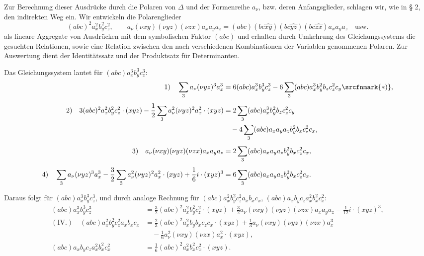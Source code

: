 Zur Berechnung dieser Ausdrücke durch die Polaren von $\Delta$ und der Formenreihe $a_\nu$, bzw. deren Anfangsglieder, schlagen wir, wie in § 2, den indirekten Weg ein. Wir entwickeln die Polarenglieder
\[
(abc)^2a_x^2b_y^2c_z^2,
\qquad
 a_\nu(\nu xy)(\nu yz)(\nu zx)a_xa_ya_z=(abc)(bc\widehat{xy})(bc\widehat{yz})(bc\widehat{zx})a_xa_ya_z\quad\text{usw.}
\]
als lineare Aggregate von Ausdrücken mit dem symbolischen Faktor $(abc)$ und erhalten durch Umkehrung des Gleichungssystems die gesuchten Relationen, sowie eine Relation zwischen den nach verschiedenen Kombinationen der Variablen genommenen Polaren. Zur Auswertung dient der Identitätssatz und der Produktsatz für Determinanten.

Das Gleichungssystem lautet für $(abc)a_x^3b_y^3c_z^3$:
\begingroup\small
\[
\begin{aligned}
1)\quad
\sum_3a_\nu(\nu yz)^3a_x^3
&=6(abc)a_x^3b_y^3c_z^3-6\sum_3(abc)a_x^3b_y^2b_zc_z^2c_y\srcfnmark{*)},\\[0.4em]
2)\quad
3(abc)^2a_x^2b_y^2c_z^2\cdot(xyz)-\frac12\sum_3a_\nu^2(\nu yz)^2a_x^2\cdot(xyz)
&=2\sum_3(abc)a_x^3b_y^2b_zc_z^2c_y\\
&\quad-4\sum_3(abc)a_xa_ya_zb_y^2b_xc_z^2c_x,\\[0.4em]
3)\quad
a_\nu(\nu xy)(\nu yz)(\nu zx)a_xa_ya_z
&=2\sum_3(abc)a_xa_ya_zb_y^2b_xc_z^2c_x,\\[0.4em]
4)\quad
\sum_3a_\nu(\nu yz)^3a_x^3-\frac32\sum_3a_\nu^2(\nu yz)^2a_x^2\cdot(xyz)+\frac16i\cdot(xyz)^3
&=6\sum_3(abc)a_xa_ya_zb_y^2b_xc_z^2c_x.
\end{aligned}
\]
\endgroup
{}

Daraus folgt für $(abc)a_x^3b_y^3c_z^3$, und durch analoge Rechnung für $(abc)a_x^2b_y^2c_z^2a_xb_xc_x$, $(abc)a_xb_yc_za_x^2b_x^2c_x^2$:
\[
\begin{aligned}
(abc)a_x^3b_y^3c_z^3
&=\frac32(abc)^2a_x^2b_y^2c_z^2\cdot(xyz)
+\frac32a_\nu(\nu xy)(\nu yz)(\nu zx)a_xa_ya_z
-\frac1{12}i\cdot(xyz)^3,\\[0.4em]
(\mathrm{IV}.)\quad
(abc)a_x^2b_y^2c_z^2a_xb_xc_x
&=\frac23(abc)^2a_x^2b_yb_xc_zc_x\cdot(xyz)
+\frac13a_\nu(\nu xy)(\nu yz)(\nu zx)a_x^3\\
&\quad-\frac16a_\nu^2(\nu xy)(\nu zx)a_x^2\cdot(xyz),\\[0.4em]
(abc)a_xb_yc_za_x^2b_x^2c_x^2
&=\frac16(abc)^2a_x^2b_x^2c_x^2\cdot(xyz).
\end{aligned}
\]

